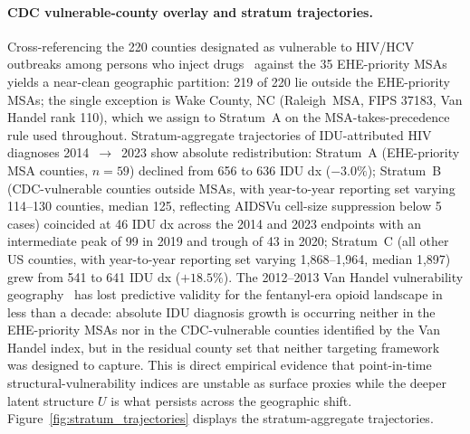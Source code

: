 \documentclass[12pt]{article}
\begin{document}
\paragraph{CDC vulnerable-county overlay and stratum trajectories.} Cross-referencing the 220 counties designated as vulnerable to HIV/HCV outbreaks among persons who inject drugs~\cite{cdc220counties} against the 35 EHE-priority MSAs yields a near-clean geographic partition: 219 of 220 lie outside the EHE-priority MSAs; the single exception is Wake County, NC (Raleigh~MSA, FIPS 37183, Van Handel rank 110), which we assign to Stratum~A on the MSA-takes-precedence rule used throughout. Stratum-aggregate trajectories of IDU-attributed HIV diagnoses 2014~$\to$~2023 show absolute redistribution: Stratum~A (EHE-priority MSA counties, $n = 59$) declined from 656 to 636 IDU dx ($-3.0\%$); Stratum~B (CDC-vulnerable counties outside MSAs, with year-to-year reporting set varying 114--130 counties, median 125, reflecting AIDSVu cell-size suppression below 5 cases) coincided at 46 IDU dx across the 2014 and 2023 endpoints with an intermediate peak of 99 in 2019 and trough of 43 in 2020; Stratum~C (all other US counties, with year-to-year reporting set varying 1{,}868--1{,}964, median 1{,}897) grew from 541 to 641 IDU dx ($+18.5\%$). The 2012--2013 Van Handel vulnerability geography~\cite{vanhandel2016} has lost predictive validity for the fentanyl-era opioid landscape in less than a decade: absolute IDU diagnosis growth is occurring neither in the EHE-priority MSAs nor in the CDC-vulnerable counties identified by the Van Handel index, but in the residual county set that neither targeting framework was designed to capture. This is direct empirical evidence that point-in-time structural-vulnerability indices are unstable as surface proxies while the deeper latent structure $U$ is what persists across the geographic shift. Figure~\ref{fig:stratum_trajectories} displays the stratum-aggregate trajectories.
\end{document}
